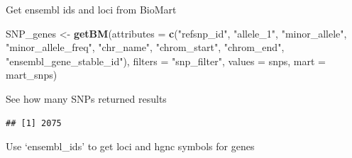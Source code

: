 \documentclass[]{article}
\newenvironment{Shaded}{\begin{snugshade}}{\end{snugshade}}
\newcommand{\KeywordTok}[1]{\textcolor[rgb]{0.13,0.29,0.53}{\textbf{#1}}}
\newcommand{\DataTypeTok}[1]{\textcolor[rgb]{0.13,0.29,0.53}{#1}}
\newcommand{\StringTok}[1]{\textcolor[rgb]{0.31,0.60,0.02}{#1}}
\newcommand{\CommentTok}[1]{\textcolor[rgb]{0.56,0.35,0.01}{\textit{#1}}}
\newcommand{\OperatorTok}[1]{\textcolor[rgb]{0.81,0.36,0.00}{\textbf{#1}}}
\newcommand{\NormalTok}[1]{#1}
\begin{document}
Get ensembl ids and loci from BioMart

\begin{Shaded}
\end{Shaded}

\begin{Shaded}
\begin{Highlighting}[]
\NormalTok{SNP_genes <-}\StringTok{ }\KeywordTok{getBM}\NormalTok{(}\DataTypeTok{attributes =} \KeywordTok{c}\NormalTok{(}\StringTok{"refsnp_id"}\NormalTok{, }\StringTok{"allele_1"}\NormalTok{, }\StringTok{"minor_allele"}\NormalTok{, }\StringTok{"minor_allele_freq"}\NormalTok{, }\StringTok{"chr_name"}\NormalTok{, }\StringTok{"chrom_start"}\NormalTok{, }\StringTok{"chrom_end"}\NormalTok{, }\StringTok{"ensembl_gene_stable_id"}\NormalTok{),}
                     \DataTypeTok{filters =} \StringTok{"snp_filter"}\NormalTok{,}
                     \DataTypeTok{values =}\NormalTok{ snps,}
                     \DataTypeTok{mart =}\NormalTok{ mart_snps)}
\end{Highlighting}
\end{Shaded}

See how many SNPs returned results

\begin{Shaded}
\end{Shaded}

\begin{verbatim}
## [1] 2075
\end{verbatim}

Use `ensembl\_ids' to get loci and hgnc symbols for genes
\end{document}

